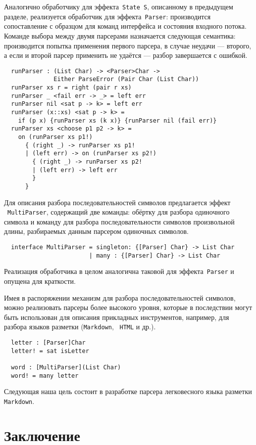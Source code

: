 \documentclass [a4paper] {article}
\begin{document}
Аналогично обработчику для эффекта~\texttt{State S}, описанному в предыдущем
разделе, реализуется обработчик для эффекта~\texttt{Parser}: производится
сопоставление с образцом для команд интерфейса и состояния входного потока.
Команде выбора между двумя парсерами назначается следующая семантика:
производится попытка применения первого парсера, в случае неудачи --- второго, а
если и второй парсер применить не удаётся --- разбор завершается с ошибкой.
\begin{verbatim}
  runParser : (List Char) -> <Parser>Char ->
              Either ParseError (Pair Char (List Char))
  runParser xs r = right (pair r xs)
  runParser _ <fail err -> _> = left err
  runParser nil <sat p -> k> = left err
  runParser (x::xs) <sat p -> k> =
    if (p x) {runParser xs (k x)} {runParser nil (fail err)}
  runParser xs <choose p1 p2 -> k> =
    on (runParser xs p1!)
      { (right _) -> runParser xs p1!
      | (left err) -> on (runParser xs p2!)
        { (right _) -> runParser xs p2!
        | (left err) -> left err
        }
      }
\end{verbatim}

Для описания разбора последовательностей символов предлагается эффект
~\texttt{MultiParser}, содержащий две команды: обёртку для разбора одиночного
символа и команду для разбора последовательности символов произвольной длины,
разбираемых данным парсером одиночных символов.
\begin{verbatim}
  interface MultiParser = singleton: {[Parser] Char} -> List Char
                        | many : {[Parser] Char} -> List Char
\end{verbatim}
Реализация обработчика в целом аналогична таковой для эффекта~\texttt{Parser}
и опущена для краткости.

Имея в распоряжении механизм для разбора последовательностей символов, можно
реализовать парсеры более высокого уровня, которые в последствии могут быть
использован для описания прикладных инструментов, например, для разбора
языков разметки (\texttt{Markdown}, ~\texttt{HTML} и др.).
\begin{verbatim}
  letter : [Parser]Char
  letter! = sat isLetter

  word : [MultiParser](List Char)
  word! = many letter
\end{verbatim}
Следующая наша цель состоит в разработке парсера легковесного языка разметки
\texttt{Markdown}.

\section*{Заключение}
\end{document}
